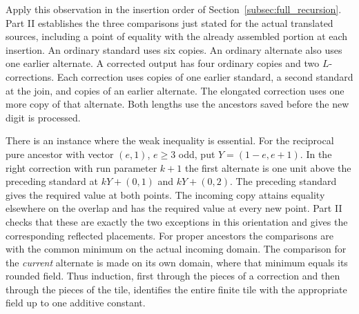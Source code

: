 Apply this observation in the insertion order of Section~\ref{subsec:full_recursion}. Part II establishes the three comparisons just stated for the actual translated sources, including a point of equality with the already assembled portion at each insertion. An ordinary standard uses six copies. An ordinary alternate also uses one earlier alternate. A corrected output has four ordinary copies and two $L$-corrections. Each correction uses copies of one earlier standard, a second standard at the join, and copies of an earlier alternate. The elongated correction uses one more copy of that alternate. Both lengths use the ancestors saved before the new digit is processed.

There is an instance where the weak inequality is essential. For the reciprocal pure ancestor with vector $(e,1)$, $e\ge3$ odd, put $Y=(1-e,e+1)$. In the right correction with run parameter $k+1$ the first alternate is one unit above the preceding standard at $kY+(0,1)$ and $kY+(0,2)$. The preceding standard gives the required value at both points. The incoming copy attains equality elsewhere on the overlap and has the required value at every new point. Part II checks that these are exactly the two exceptions in this orientation and gives the corresponding reflected placements. For proper ancestors the comparisons are with the common minimum on the actual incoming domain. The comparison for the \emph{current} alternate is made on its own domain, where that minimum equals its rounded field. Thus induction, first through the pieces of a correction and then through the pieces of the tile, identifies the entire finite tile with the appropriate field up to one additive constant.

